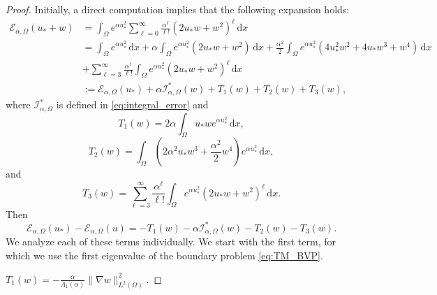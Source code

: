 \documentclass[reqno,11pt]{amsart}
\theoremstyle{definition}
\newcommand{\ud}{\,\mathrm{d}}
\begin{document}
\begin{proof}
Initially, a direct computation implies that the following expansion holds: 
\begin{align} \label{expansion1} 
\nonumber
\mathscr{E}_{\alpha,\Omega} (u_* + w)
&= \int_\Omega e^{\alpha u_*^2} \sum_{\ell =0}^\infty \frac{\alpha^\ell}{\ell !}
(2u_* w + w^2)^\ell \ud x \\ \nonumber 
& = \int_\Omega e^{\alpha u_*^2} \ud x + \alpha \int_\Omega e^{\alpha u_*^2} 
(2u_* w + w^2) \ud x + \frac{\alpha^2}{2} \int_\Omega e^{\alpha u_*^2} (4u_*^2 w^2 
+ 4u_* w^3 + w^4) \ud x\\\nonumber
&+ \sum_{\ell=3}^\infty \frac{\alpha^\ell}{\ell !} \int_\Omega e^{\alpha u_*^2} 
(2u_* w + w^2)^\ell \ud x\\
&:=\mathscr{E}_{\alpha,\Omega} (u_*)+\alpha\mathcal{I}^*_{\alpha,\Omega}(w)+T_1(w)+T_2(w)+T_3(w),
\end{align} 
where $\mathcal{I}^*_{\alpha,\Omega}$ is defined in \eqref{eq:integral_error} and
\[
T_1(w) = 2\alpha \int_\Omega u_* w e^{\alpha u_*^2} \ud x,
\]
\[
T_2(w) = \int_{\Omega} \left (2\alpha^2 u_* w^3 + 
\frac{\alpha^2}{2} w^4 \right ) e^{\alpha u_*^2} \ud x, 
\]
and
\[
T_3(w) = \sum_{\ell=3}^\infty \frac{\alpha^\ell}{\ell !} \int_\Omega e^{\alpha u_*^2} 
(2u_* w + w^2)^\ell \ud x. 
\]
Then
\[\mathscr{E}_{\alpha,\Omega} (u_*) - \mathscr{E}_{\alpha,\Omega} (u) =-T_1(w)-\alpha\mathcal{I}^*_{\alpha,\Omega}(w)-T_2(w)-T_3(w).\]
We analyze each of these terms individually.
We start with the first term, for which we use the first eigenvalue of the boundary problem \eqref{eq:TM_BVP}. 

 $T_1(w)=-\frac{\alpha}{\Lambda_1(\alpha)}\|\nabla w\|_{L^2(\Omega)}^2$.


\end{proof}
\end{document}
